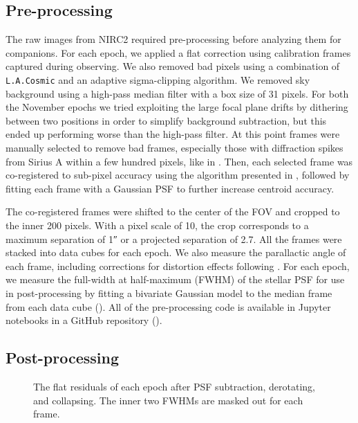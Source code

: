 \documentclass[twocolumn]{aastex631}
\begin{document}
\subsection{Pre-processing}

The raw images from NIRC2 required pre-processing before analyzing them for companions. For each epoch, we applied a flat correction using calibration frames captured during observing. We also removed bad pixels using a combination of \texttt{L.A.Cosmic} \citep{vandokkumCosmicRayRejectionLaplacian2001a} and an adaptive sigma-clipping algorithm. We removed sky background using a high-pass median filter with a box size of 31 pixels. For both the November epochs we tried exploiting the large focal plane drifts by dithering between two positions in order to simplify background subtraction, but this ended up performing worse than the high-pass filter. At this point frames were manually selected to remove bad frames, especially those with diffraction spikes from Sirius A within a few hundred pixels, like in . Then, each selected frame was co-registered to sub-pixel accuracy using the algorithm presented in \citet{guizar-sicairosEfficientSubpixelImage2008}, followed by fitting each frame with a Gaussian PSF to further increase centroid accuracy.

The co-registered frames were shifted to the center of the FOV and cropped to the inner 200 pixels. With a pixel scale of \qty{10}{\milliarcsecond}, the crop corresponds to a maximum separation of \ang{;;1} or a projected separation of \qty{2.7}{\au}. All the frames were stacked into data cubes for each epoch. We also measure the parallactic angle of each frame, including corrections for distortion effects following \citet{yeldaImprovingGalacticCenter2010}. For each epoch, we measure the full-width at half-maximum (FWHM) of the stellar PSF for use in post-processing by fitting a bivariate Gaussian model to the median frame from each data cube (). All of the pre-processing code is available in Jupyter notebooks in a GitHub repository ().

\subsection{Post-processing}

\begin{figure*}
    \centering
    \caption{The flat residuals of each epoch after PSF subtraction, derotating, and collapsing. The inner two FWHMs are masked out for each frame.}
    \label{fig:residuals}
\end{figure*}
\end{document}
